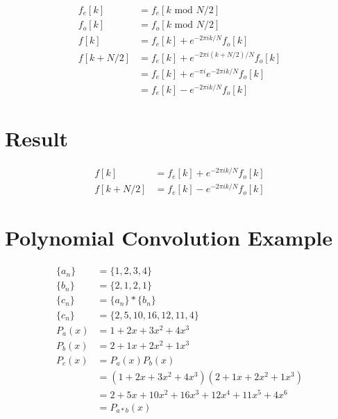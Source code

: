 \documentclass[10pt,a4paper]{article}
\begin{document}
\begin{align*}
f_e[k] &= f_e[k \text{ mod } N/2]\\
f_o[k] &= f_o[k \text{ mod } N/2]\\
f[k] &= f_e[k]+e^{-2\pi i k/N}f_o[k]\\
f[k+N/2] &= f_e[k]+e^{-2\pi i (k+N/2)/N}f_o[k]\\
&= f_e[k]+e^{-\pi i}e^{-2\pi i k/N}f_o[k]\\
&= f_e[k]-e^{-2\pi i k/N}f_o[k]
\end{align*}

\section*{Result}
\begin{align*}
f[k] &= f_e[k]+e^{-2\pi i k/N}f_o[k]\\
f[k+N/2] &= f_e[k]-e^{-2\pi i k/N}f_o[k]
\end{align*}

\section*{Polynomial Convolution Example}
\begin{align*}
\{a_n\} &= \{1,2,3,4\}\\
\{b_n\} &= \{2,1,2,1\}\\
\{c_n\} &= \{a_n\}*\{b_n\}\\
\{c_n\} &= \{2,5,10,16,12,11,4\}\\
P_a(x) &= 1+2x+3x^2+4x^3\\
P_b(x) &= 2+1x+2x^2+1x^3\\
P_c(x) &= P_a(x)P_b(x)\\
&= (1+2x+3x^2+4x^3)(2+1x+2x^2+1x^3)\\
&= 2+5x+10x^2+16x^3+12x^4+11x^5+4x^6\\
&= P_{a*b}(x)
\end{align*}
\end{document}
